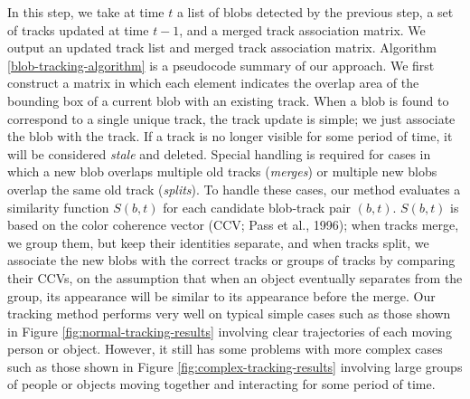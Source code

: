 In this step, we take at time $t$ a list of blobs detected by the
previous step, a set of tracks updated at time $t-1$, and a merged
track association matrix.  We output an updated track list and merged
track association matrix.  Algorithm \ref{blob-tracking-algorithm} is
a pseudocode summary of our approach.  We first construct a matrix in
which each element indicates the overlap area of the bounding box of a
current blob with an existing track.  When a blob is found to
correspond to a single unique track, the track update is simple; we
just associate the blob with the track.  If a track is no longer
visible for some period of time, it will be considered \textit{stale}
and deleted. Special handling is required for cases in which a new
blob overlaps multiple old tracks (\textit{merges}) or multiple new
blobs overlap the same old track (\textit{splits}). To handle these
cases, our method evaluates a similarity function $S(b, t)$ for each
candidate blob-track pair $(b,t)$. $S(b,t)$ is based on the color
coherence vector (CCV; Pass et al., 1996)\nocite{pass96ccv}; when
tracks merge, we group them, but keep their identities separate, and
when tracks split, we associate the new blobs with the correct tracks
or groups of tracks by comparing their CCVs, on the assumption that
when an object eventually separates from the group, its appearance
will be similar to its appearance before the merge.  Our tracking
method performs very well on typical simple cases such as those shown
in Figure \ref{fig:normal-tracking-results} involving clear
trajectories of each moving person or object. However, it still has
some problems with more complex cases such as those shown in
Figure \ref{fig:complex-tracking-results} involving large groups of
people or objects moving together and interacting for some period of
time.

